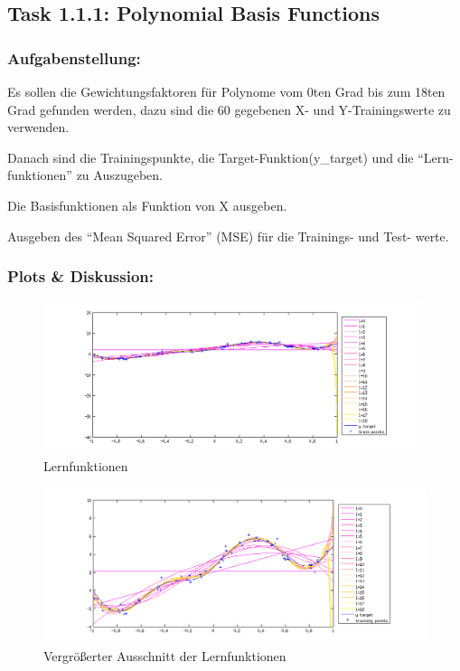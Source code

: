 \subsection{Task 1.1.1: Polynomial Basis Functions}

\subsubsection{Aufgabenstellung:}


Es sollen die Gewichtungsfaktoren für Polynome vom 0ten Grad bis zum 18ten Grad gefunden werden, dazu sind die 60 gegebenen X- und Y-Trainingswerte zu verwenden.


Danach sind die Trainingspunkte, die Target-Funktion(y\_target) und die ``Lern-funktionen'' zu Auszugeben.


Die Basisfunktionen als Funktion von X ausgeben.

Ausgeben des ``Mean Squared Error'' (MSE) für die Trainings- und Test- werte.


\subsubsection{Plots \& Diskussion:}
\begin{figure}[hp!]
\begin{center}
 \includegraphics[width=0.99\textwidth]{./figures/1_1_1_unscaled_learn_fct}
 \caption[Lernfunktionen]{Lernfunktionen}
\label{fig:unscaled_learn_fct}
\end{center}
\end{figure}


\begin{figure}[hp!]
\begin{center}
 \includegraphics[width=1\textwidth]{./figures/1_1_1_scal_learn_fct}
 \caption[Vergrö\ss{}erter Ausschnitt der Lernfunktionen]{Vergrö\ss{}erter Ausschnitt der Lernfunktionen}
\label{fig:scal_learn_fct}
\end{center}
\end{figure}

